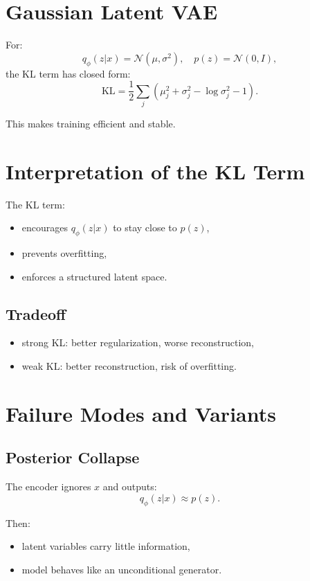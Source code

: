 \section{Gaussian Latent VAE}

For:
\[
q_\phi(z|x)=\mathcal{N}(\mu,\sigma^2),
\quad
p(z)=\mathcal{N}(0,I),
\]
the KL term has closed form:
\[
\mathrm{KL}
=
\frac{1}{2}\sum_j \left(
\mu_j^2 + \sigma_j^2 - \log \sigma_j^2 - 1
\right).
\]

This makes training efficient and stable.

\section{Interpretation of the KL Term}

The KL term:
\begin{itemize}
    \item encourages $q_\phi(z|x)$ to stay close to $p(z)$,
    \item prevents overfitting,
    \item enforces a structured latent space.
\end{itemize}

\subsection{Tradeoff}

\begin{itemize}
    \item strong KL: better regularization, worse reconstruction,
    \item weak KL: better reconstruction, risk of overfitting.
\end{itemize}

\section{Failure Modes and Variants}

\subsection{Posterior Collapse}

The encoder ignores $x$ and outputs:
\[
q_\phi(z|x) \approx p(z).
\]

Then:
\begin{itemize}
    \item latent variables carry little information,
    \item model behaves like an unconditional generator.
\end{itemize}

